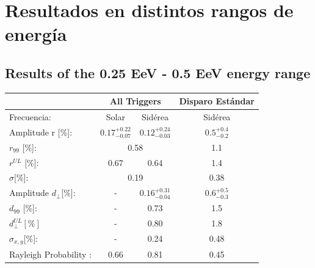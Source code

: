 \documentclass[11pt, letterpaper,oneside]{article}
\begin{document}
\section{Resultados en distintos rangos de energía}
\subsection{Results of the 0.25 EeV - 0.5 EeV energy range}



\begin{table}[H]
    \begin{small}
        \begin{center}
            \begin{tabular}[c]{l|c|c||c|}
\cline{2-4}                                       & \multicolumn{2}{c||}{All Triggers}    & \multicolumn{1}{c|}{Disparo Estándar}   \\ \hline
\multicolumn{1}{|l|}{Frecuencia:                } & Solar	                & Sidérea	                & Sidérea \cite{Aab_2020}   \\ \hline
\multicolumn{1}{|l|}{Amplitude r [\%]:           } & $0.17^{+0.22}_{-0.07}$	& $0.12^{+0.24}_{-0.03}$ 	& $0.5^{+0.4}_{-0.2}$ \cite{codigo}      \\
\multicolumn{1}{|l|}{$r_{99}$ [\%]:             } & \multicolumn{2}{c||}{0.58}                          & 1.1\cite{codigo}                 \\
\multicolumn{1}{|l|}{$r^{UL}$ [\%]:             } & 0.67 	                & 0.64                      & 1.4\cite{codigo}                 \\ 
\multicolumn{1}{|l|}{$\sigma$[\%]:              } & \multicolumn{2}{c||}{0.19}                          & 0.38\cite{codigo}       \\\hline
\multicolumn{1}{|l|}{Amplitude $d_\perp$[\%]:    } & -	                    & $0.16^{+0.31}_{-0.04}$ 	& $0.6^{+0.5}_{-0.3}$       \\
\multicolumn{1}{|l|}{$d_{99}$ [\%]:             } & - 	                    & 0.73                      & 1.5  \cite{codigo}                \\
\multicolumn{1}{|l|}{$d_{\perp}^{UL}[\%]$       } & -                       & 0.80                      & 1.8                         \\
\multicolumn{1}{|l|}{$\sigma_{x,y}$[\%]:        } & -	                    & 0.24	                    & 0.48       \\\hline
\multicolumn{1}{|l|}{Rayleigh Probability      :        } & 0.66                    & 0.81	                    & 0.45       \\

\end{tabular}
\end{center}
\end{small}
\end{table}
\end{document}
